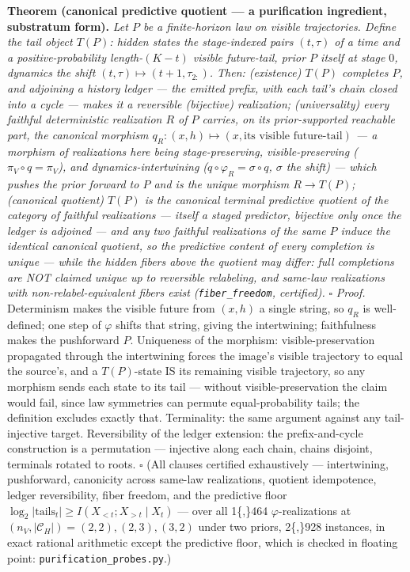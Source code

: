 \documentclass[
]{article}
\begin{document}
\textbf{Theorem (canonical predictive quotient --- a purification
ingredient, substratum form).} \emph{Let \(P\) be a finite-horizon law
on visible trajectories. Define the tail object \(T(P)\): hidden states
the stage-indexed pairs \((t, \tau)\) of a time and a
positive-probability length-\((K{-}t)\) visible future-tail, prior \(P\)
itself at stage \(0\), dynamics the shift
\((t, \tau) \mapsto (t{+}1, \tau_{2:})\). Then: (existence) \(T(P)\)
completes \(P\), and adjoining a history ledger --- the emitted prefix,
with each tail's chain closed into a cycle --- makes it a reversible
(bijective) realization; (universality) every faithful deterministic
realization \(R\) of \(P\) carries, on its prior-supported reachable
part, the canonical morphism
\(q_R: (x, h) \mapsto (x, \text{its visible future-tail})\) --- a
morphism of realizations here being stage-preserving, visible-preserving
(\(\pi_V \circ q = \pi_V\)), and dynamics-intertwining
(\(q \circ \varphi_R = \sigma \circ q\), \(\sigma\) the shift) --- which
pushes the prior forward to \(P\) and is the unique morphism
\(R \to T(P)\); (canonical quotient) \(T(P)\) is the canonical terminal
predictive quotient of the category of faithful realizations --- itself
a staged predictor, bijective only once the ledger is adjoined --- and
any two faithful realizations of the same \(P\) induce the identical
canonical quotient, so the predictive content of every completion is
unique --- while the hidden fibers above the quotient may differ: full
completions are NOT claimed unique up to reversible relabeling, and
same-law realizations with non-relabel-equivalent fibers exist
(\texttt{fiber\_freedom}, certified).} \(\square\) \emph{Proof.}
Determinism makes the visible future from \((x, h)\) a single string, so
\(q_R\) is well-defined; one step of \(\varphi\) shifts that string,
giving the intertwining; faithfulness makes the pushforward \(P\).
Uniqueness of the morphism: visible-preservation propagated through the
intertwining forces the image's visible trajectory to equal the
source's, and a \(T(P)\)-state IS its remaining visible trajectory, so
any morphism sends each state to its tail --- without
visible-preservation the claim would fail, since law symmetries can
permute equal-probability tails; the definition excludes exactly that.
Terminality: the same argument against any tail-injective target.
Reversibility of the ledger extension: the prefix-and-cycle construction
is a permutation --- injective along each chain, chains disjoint,
terminals rotated to roots. \(\square\) (All clauses certified
exhaustively --- intertwining, pushforward, canonicity across same-law
realizations, quotient idempotence, ledger reversibility, fiber freedom,
and the predictive floor
\(\log_2 |\mathrm{tails}_t| \geq I(X_{<t}; X_{>t} \mid X_t)\) --- over
all 1\{,\}464 \(\varphi\)-realizations at
\((n_V, |\mathcal{C}_H|) = (2,2), (2,3), (3,2)\) under two priors,
2\{,\}928 instances, in exact rational arithmetic except the predictive
floor, which is checked in floating point:
\texttt{purification\_probes.py}.)
\end{document}
